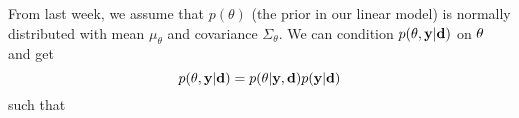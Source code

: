 From last week, we assume that $p(\theta)$ (the prior in our linear model) is normally distributed with mean $\mu_\theta$ and covariance $\Sigma_\theta$.
We can condition $p(\mathbf{\theta}, \mathbf{y}|\mathbf{d})$ on $\mathbf{\theta}$ and get
$$p(\mathbf{\theta}, \mathbf{y}|\mathbf{d}) = p(\mathbf{\theta}|\mathbf{y}, \mathbf{d})p(\mathbf{y}|\mathbf{d})$$
such that 
